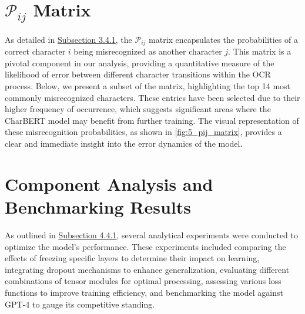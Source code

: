 
\label{chap:5_results_and_discussion}

\section{$\mathcal{P}_{ij}$ Matrix}
\label{sec:5_pij_matrix}
As detailed in \hyperref[subsec:3_get_pij]{Subsection 3.4.1}, the $\mathcal{P}_{ij}$ matrix encapsulates the probabilities of a correct character $i$ being misrecognized as another character $j$. This matrix is a pivotal component in our analysis, providing a quantitative measure of the likelihood of error between different character transitions within the OCR process. Below, we present a subset of the matrix, highlighting the top 14 most commonly misrecognized characters. These entries have been selected due to their higher frequency of occurrence, which suggests significant areas where the CharBERT model may benefit from further training. The visual representation of these misrecognition probabilities, as shown in \autoref{fig:5_pij_matrix}, provides a clear and immediate insight into the error dynamics of the model. 


\section{Component Analysis and Benchmarking Results}
\label{sec:5_component_analysis_and_benchmarking_results}
As outlined in \hyperref[subsec:4_component_analysis_and_benchmarking]{Subsection 4.4.1}, several analytical experiments were conducted to optimize the model's performance. These experiments included comparing the effects of freezing specific layers to determine their impact on learning, integrating dropout mechanisms to enhance generalization, evaluating different combinations of tensor modules for optimal processing, assessing various loss functions to improve training efficiency, and benchmarking the model against GPT-4 to gauge its competitive standing.

